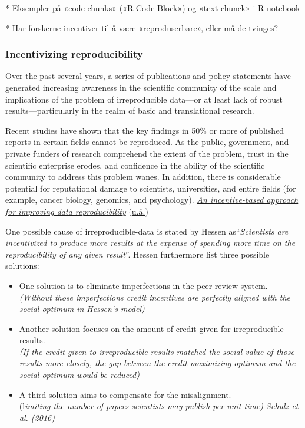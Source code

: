 \documentclass[
  12pt,
  norsk,
]{article}
\begin{document}
* Eksempler på «code chunks» («R Code Block») og «text chunck» i R
notebook

* Har forskerne incentiver til å være «reproduserbare», eller må de
tvinges?

\hypertarget{incentivizing-reproducibility}{%
\subsubsection{Incentivizing
reproducibility}\label{incentivizing-reproducibility}}

Over the past several years, a series of publications and policy
statements have generated increasing awareness in the scientific
community of the scale and implications of the problem of irreproducible
data---or at least lack of robust results---particularly in the realm of
basic and translational research.

Recent studies have shown that the key findings in 50\% or more of
published reports in certain fields cannot be reproduced. As the public,
government, and private funders of research comprehend the extent of the
problem, trust in the scientific enterprise erodes, and confidence in
the ability of the scientific community to address this problem wanes.
In addition, there is considerable potential for reputational damage to
scientists, universities, and entire fields (for example, cancer
biology, genomics, and psychology).
\protect\hyperlink{ref-Science.org}{\emph{An incentive-based approach
for improving data reproducibility}}
(\protect\hyperlink{ref-Science.org}{u.å.})

One possible cause of irreproducible-data is stated by Hessen
as``\emph{Scientists are incentivized to produce more results at the
expense of spending more time on the reproducibility of any given
result}''. Hessen furthermore list three possible solutions:

\begin{itemize}
\item
  One solution is to eliminate imperfections in the peer review
  system.\\
  \emph{(Without those imperfections credit incentives are perfectly
  aligned with the social optimum in Hessen`s model)}
\item
  Another solution focuses on the amount of credit given for
  irreproducible results.\\
  \emph{(If the credit given to irreproducible results matched the
  social value of those results more closely, the gap between the
  credit-maximizing optimum and the social optimum would be reduced)}
\item
  A third solution aims to compensate for the misalignment.\\
  (l\emph{imiting the number of papers scientists may publish per unit
  time) \protect\hyperlink{ref-schulz2016}{Schulz et al.}
  (\protect\hyperlink{ref-schulz2016}{2016})}
\end{itemize}
\end{document}
